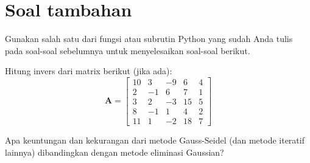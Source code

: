 

\section{Soal tambahan}

Gunakan salah satu dari fungsi atau subrutin Python yang sudah Anda tulis
pada soal-soal sebelumnya untuk menyelesaikan soal-soal berikut.

\begin{soal}
Hitung invers dari matrix berikut (jika ada):
\begin{equation*}
\mathbf{A} = \begin{bmatrix}
10 & 3 & -9 & 6 & 4 \\
2 & -1 & 6 & 7 & 1 \\
3 & 2 & -3 & 15 & 5 \\
8 & -1 & 1 & 4 & 2 \\
11 & 1 & -2 & 18 & 7
\end{bmatrix}
\end{equation*}
\end{soal}











\begin{soal}
Apa keuntungan dan kekurangan dari metode Gauss-Seidel (dan metode iteratif lainnya)
dibandingkan dengan metode eliminasi Gaussian?
\end{soal}


